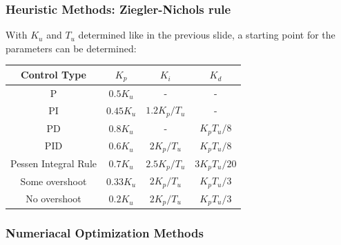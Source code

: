 \begin{frame}
	\frametitle{Heuristic Methods: Ziegler-Nichols rule}
	With $K_u$ and $T_u$ determined like in the previous slide, a starting point for the parameters can be determined:
	\vspace{1em}
	
	\begin{tabular}{c | c | c |c}
		Control Type	&	$K_p$		&	$K_i$			&	$K_d$ 	\\
		\hline
		P				&	$0.5K_u$	&	-				&	-		\\
		PI				&	$0.45K_u$	&	$1.2K_p/T_u$		&	-		\\
		PD				&	$0.8K_u$	&	-				&	$K_pT_u/8$ \\
		PID				&	$0.6K_u$	&	$2K_p/T_u$		&	$K_pT_u/8$ \\
		Pessen Integral Rule & $0.7K_u$ &	$2.5K_p/T_u$	&	$3K_pT_u/20$\\
		Some overshoot	&	$0.33K_u$	&	$2K_p/T_u$		&	$K_pT_u/3$	\\
		No overshoot	&	$0.2K_u$	&	$2K_p/T_u$		&	$K_pT_u/3$	\\
	\end{tabular}
\end{frame}

\begin{frame}
	\frametitle{Numeriacal Optimization Methods}
	
\end{frame}